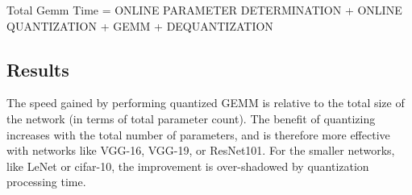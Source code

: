 Total Gemm Time = ONLINE PARAMETER DETERMINATION + ONLINE QUANTIZATION + GEMM + DEQUANTIZATION

\subsection{Results}
The speed gained by performing quantized GEMM is relative to the total size of the network (in terms of total parameter count). The benefit of quantizing increases with the total number of parameters, and is therefore more effective with networks like VGG-16, VGG-19, or ResNet101. For the smaller networks, like LeNet or cifar-10, the improvement is over-shadowed by quantization processing time.